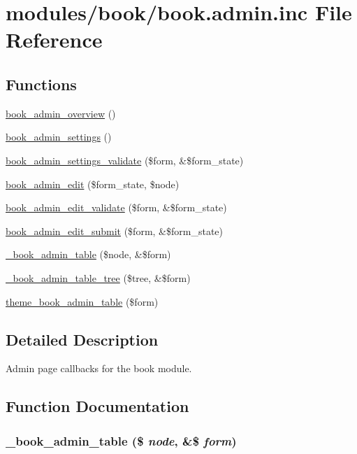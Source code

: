 \hypertarget{book_8admin_8inc}{
\section{modules/book/book.admin.inc File Reference}
\label{book_8admin_8inc}
}
\subsection*{Functions}
\begin{CompactItemize}
\item 
\hyperlink{book_8admin_8inc_8157d71732b3c171a9328b73059f2716}{book\_\-admin\_\-overview} ()
\item 
\hyperlink{group__forms_g036f1d2ed17d79b71545c955c864cf2e}{book\_\-admin\_\-settings} ()
\item 
\hyperlink{book_8admin_8inc_18c68be0c946b1fdf59bed35fc266d60}{book\_\-admin\_\-settings\_\-validate} (\$form, \&\$form\_\-state)
\item 
\hyperlink{group__forms_g3add8d3b6439de3883a30986428fdc87}{book\_\-admin\_\-edit} (\$form\_\-state, \$node)
\item 
\hyperlink{book_8admin_8inc_e92ff3db1b9b0f3a9832e1db72d5faec}{book\_\-admin\_\-edit\_\-validate} (\$form, \&\$form\_\-state)
\item 
\hyperlink{book_8admin_8inc_f0fb9b52db15bf3bc44c63d5b9042c69}{book\_\-admin\_\-edit\_\-submit} (\$form, \&\$form\_\-state)
\item 
\hyperlink{book_8admin_8inc_5a76c710890bc8a1bf273f7a56a82830}{\_\-book\_\-admin\_\-table} (\$node, \&\$form)
\item 
\hyperlink{book_8admin_8inc_67224aa7f69e5f25baca3d08b4b7dc5c}{\_\-book\_\-admin\_\-table\_\-tree} (\$tree, \&\$form)
\item 
\hyperlink{group__themeable_g250393c4077bcc35d19c833dcdc999d4}{theme\_\-book\_\-admin\_\-table} (\$form)
\end{CompactItemize}


\subsection{Detailed Description}
Admin page callbacks for the book module. 

\subsection{Function Documentation}
\hypertarget{book_8admin_8inc_5a76c710890bc8a1bf273f7a56a82830}{
\subsubsection[{\_\-book\_\-admin\_\-table}]{\setlength{\rightskip}{0pt plus 5cm}\_\-book\_\-admin\_\-table (\$ {\em node}, \/  \&\$ {\em form})}}
\label{book_8admin_8inc_5a76c710890bc8a1bf273f7a56a82830}


